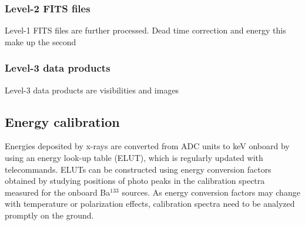 \documentclass{aa}
\begin{document}
\subsubsection{Level-2 FITS files}
Level-1 FITS files are further processed. 
Dead time  correction and energy this make up the second
\subsubsection{Level-3 data products}
Level-3 data products are visibilities and images

\subsection{Energy calibration}
Energies deposited by x-rays are converted from ADC units 
to keV onboard by using an energy look-up table (ELUT),
 which is regularly updated  with telecommands.
ELUTs can be constructed using energy conversion factors obtained by studying
positions of photo peaks in the calibration spectra measured for the onboard Ba$^{133}$ sources.  
As energy conversion factors may change with temperature 
or polarization effects,  calibration spectra need to be analyzed promptly on the ground. 
\end{document}
